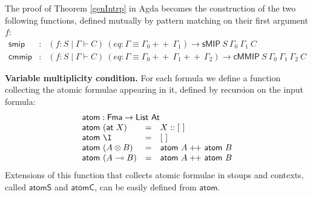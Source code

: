 \documentclass[sn-mathphys-num]{sn-jnl}%
\newcommand{\ot}{\otimes}
\newcommand{\lolli}{\multimap}
\newcommand{\sMIP}{\textsf{sMIP}}
\newcommand{\cMMIP}{\textsf{cMMIP}}
\newcommand{\List}{\mathsf{List}}
\newcommand{\append}{+\!\!+}
\newcommand{\At}{\mathsf{At}}
\newcommand{\Fma}{\mathsf{Fma}}
\theoremstyle{thmstyleone}%
\theoremstyle{thmstyletwo}%
\theoremstyle{thmstylethree}%
\begin{document}
The proof of Theorem \ref{genIntrp} in Agda becomes the construction of the two following functions, defined mutually by pattern matching on their first argument $f$:
\[
\begin{array}{rcl}
\mathsf{smip} & : & (f : S \mid \Gamma \vdash C)
~(eq : \Gamma \equiv \Gamma_0 \append ~\Gamma_1)
\to \sMIP ~S~\Gamma_0~\Gamma_1~C
\\[2pt]
\mathsf{cmmip} & : & (f : S \mid \Gamma \vdash C)
~(eq : \Gamma \equiv \Gamma_0 \append ~\Gamma_1 \append ~\Gamma_2)
\to \cMMIP ~S~\Gamma_0~\Gamma_1~\Gamma_2~C
\end{array}
\]

\noindent\textbf{Variable multiplicity condition.}
For each formula we define a function collecting the atomic formulae appearing in it, defined by recursion on the input formula:
\[
\begin{array}{lcl}
  \multicolumn{3}{l}{\mathsf{atom} : \Fma \to \List ~\At} \\
  \mathsf{atom} ~(\mathsf{at} ~X) & = & X :: [~] \\
  \mathsf{atom} ~\I &=& [~] \\
  \mathsf{atom} ~(A \ot B) &=& \mathsf{atom} ~A \append~ \mathsf{atom} ~B \\
  \mathsf{atom} ~(A \lolli B) &=& \mathsf{atom} ~A \append~ \mathsf{atom} ~B
\end{array}
\]
Extensions of this function that collects atomic formulae in stoups and contexts, called $\mathsf{atomS}$ and $\mathsf{atomC}$, can be easily defined from $\mathsf{atom}$.
\end{document}
